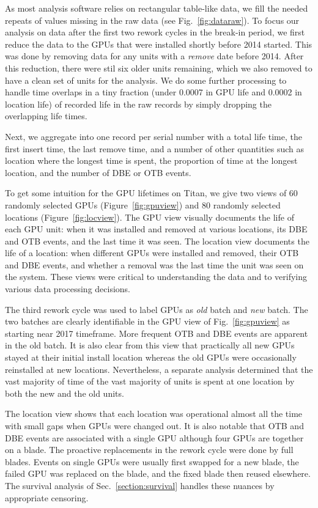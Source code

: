 As most analysis software relies on rectangular table-like data, we
fill the needed repeats of values missing in the raw data (see
Fig.~\ref{fig:dataraw}). To focus our analysis on data after the first
two rework cycles in the break-in period, we first reduce the data to
the GPUs that were installed shortly before 2014 started. This was
done by removing data for any units with a {\em remove} date before
2014. After this reduction, there were stil six older units remaining,
which we also removed to have a clean set of units for the
analysis. We do some further processing to handle time overlaps in a
tiny fraction (under 0.0007 in GPU life and 0.0002 in location life)
of recorded life in the raw records by simply dropping the overlapping
life times.

Next, we aggregate into one record per serial number with a total life
time, the first insert time, the last remove time, and a number of
other quantities such as location where the longest time is spent, the
proportion of time at the longest location, and the number of DBE or
OTB events.

To get some intuition for the GPU lifetimes on Titan, we give two
views of 60 randomly selected GPUs (Figure~\ref{fig:gpuview}) and 80
randomly selected locations (Figure~\ref{fig:locview}).
The GPU view
visually documents the life of each GPU unit: when it was installed and
removed at various locations, its DBE and OTB events, and the last
time it was seen. The location view documents the life of a location:
when different GPUs were installed and removed, their OTB and DBE
events, and whether a removal was the last time the unit was seen on
the system. These views were critical to understanding the data and to
verifying various data processing decisions.

The third rework cycle was used to label GPUs as {\em old} batch and
{\em new} batch. The two batches are clearly identifiable in the GPU
view of Fig.~\ref{fig:gpuview} as starting near 2017 timeframe. More
frequent OTB and DBE events are apparent in the old batch. It is also
clear from this view that practically all new GPUs stayed at their
initial install location whereas the old GPUs were occasionally
reinstalled at new locations. Nevertheless, a separate analysis
determined that the vast majority of time of the vast majority of
units is spent at one location by both the new and the old units.

The location view shows that each location was operational almost all
the time with small gaps when GPUs were changed out. It is also
notable that OTB and DBE events are associated with a single GPU
although four GPUs are together on a blade. The proactive replacements
in the rework cycle were done by full blades. Events on single GPUs
were usually first swapped for a new blade, the failed GPU was
replaced on the blade, and the fixed blade then reused elsewhere. The
survival analysis of Sec.~\ref{section:survival} handles these nuances
by appropriate censoring.
